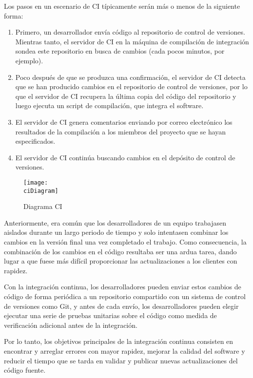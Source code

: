 Los pasos en un escenario de CI típicamente serán más o menos de la siguiente forma:
\begin{enumerate}
    \item Primero, un desarrollador envía código al repositorio de control de versiones. Mientras tanto, el servidor de CI en la máquina de compilación de integración sondea este repositorio en busca de cambios (cada pocos minutos, por ejemplo).
    \item Poco después de que se produzca una confirmación, el servidor de CI detecta que se han producido cambios en el repositorio de control de versiones, por lo que el servidor de CI recupera la última copia del código del repositorio y luego ejecuta un script de compilación, que integra el software.
    \item El servidor de CI genera comentarios enviando por correo electrónico los resultados de la compilación a los miembros del proyecto que se hayan especificados.
    \item El servidor de CI continúa buscando cambios en el depósito de control de versiones.
\end{enumerate}

\begin{figure}[h]
    \centering
    \texttt{[image: \\ciDiagram]}
    \caption{Diagrama CI \cite{CI_Paul_Duvall}}
\end{figure}

Anteriormente, era común que los desarrolladores de un equipo trabajasen aislados durante un largo periodo de tiempo y solo intentasen combinar los cambios en la versión final una vez completado el trabajo. Como consecuencia, la combinación de los cambios en el código resultaba ser una ardua tarea, dando lugar a que fuese más difícil proporcionar las actualizaciones a los clientes con rapidez.

Con la integración continua, los desarrolladores pueden enviar estos cambios de código de forma periódica a un repositorio compartido con un sistema de control de versiones como Git, y antes de cada envío, los desarrolladores pueden elegir ejecutar una serie de pruebas unitarias sobre el código como medida de verificación adicional antes de la integración.

Por lo tanto, los objetivos principales de la integración continua consisten en encontrar y arreglar errores con mayor rapidez, mejorar la calidad del software y reducir el tiempo que se tarda en validar y publicar nuevas actualizaciones del código fuente.

